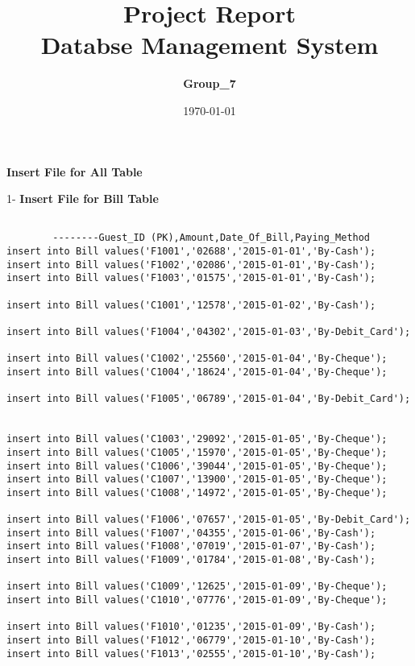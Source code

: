\documentclass[a4,12pt]{report}
\title{ Project Report \\
				 \textbf{Databse Management System}}
\author{\textbf{Group\_7}}
\date{\today}
\begin{document}
\maketitle

\begin{center}
\textbf{ \large{Insert File for All Table \\
}}

\end{center}


\begin{flushleft}
1- \textbf{ Insert File for Bill Table}
\end{flushleft}
\begin{lstlisting}

		--------Guest_ID (PK),Amount,Date_Of_Bill,Paying_Method
insert into Bill values('F1001','02688','2015-01-01','By-Cash');
insert into Bill values('F1002','02086','2015-01-01','By-Cash');
insert into Bill values('F1003','01575','2015-01-01','By-Cash');

insert into Bill values('C1001','12578','2015-01-02','By-Cash');

insert into Bill values('F1004','04302','2015-01-03','By-Debit_Card');

insert into Bill values('C1002','25560','2015-01-04','By-Cheque');
insert into Bill values('C1004','18624','2015-01-04','By-Cheque');

insert into Bill values('F1005','06789','2015-01-04','By-Debit_Card');


insert into Bill values('C1003','29092','2015-01-05','By-Cheque');
insert into Bill values('C1005','15970','2015-01-05','By-Cheque');
insert into Bill values('C1006','39044','2015-01-05','By-Cheque');
insert into Bill values('C1007','13900','2015-01-05','By-Cheque');
insert into Bill values('C1008','14972','2015-01-05','By-Cheque');

insert into Bill values('F1006','07657','2015-01-05','By-Debit_Card');
insert into Bill values('F1007','04355','2015-01-06','By-Cash');
insert into Bill values('F1008','07019','2015-01-07','By-Cash');
insert into Bill values('F1009','01784','2015-01-08','By-Cash');

insert into Bill values('C1009','12625','2015-01-09','By-Cheque');
insert into Bill values('C1010','07776','2015-01-09','By-Cheque');

insert into Bill values('F1010','01235','2015-01-09','By-Cash');
insert into Bill values('F1012','06779','2015-01-10','By-Cash');
insert into Bill values('F1013','02555','2015-01-10','By-Cash');


\end{lstlisting}
\end{document}
